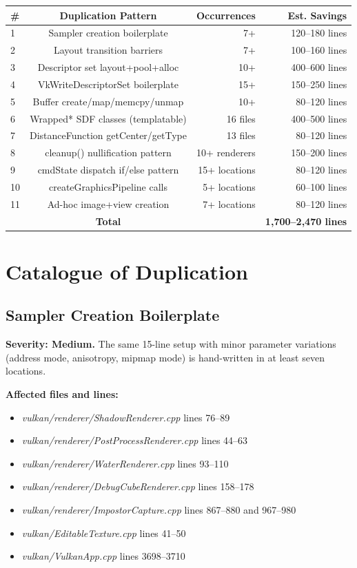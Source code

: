 \documentclass[11pt,a4paper]{article}
\newcommand{\code}[1]{\texttt{\detokenize{#1}}}
\newcommand{\file}[1]{\textsl{#1}}
\begin{document}
\begin{center}
\begin{tabular}{lcrr}
\toprule
\# & Duplication Pattern & Occurrences & Est. Savings \\
\midrule
1 & Sampler creation boilerplate & 7+ & 120--180 lines \\
2 & Layout transition barriers & 7+ & 100--160 lines \\
3 & Descriptor set layout+pool+alloc & 10+ & 400--600 lines \\
4 & VkWriteDescriptorSet boilerplate & 15+ & 150--250 lines \\
5 & Buffer create/map/memcpy/unmap & 10+ & 80--120 lines \\
6 & Wrapped* SDF classes (templatable) & 16 files & 400--500 lines \\
7 & DistanceFunction getCenter/getType & 13 files & 80--120 lines \\
8 & cleanup() nullification pattern & 10+ renderers & 150--200 lines \\
9 & cmdState dispatch if/else pattern & 15+ locations & 80--120 lines \\
10 & createGraphicsPipeline calls & 5+ locations & 60--100 lines \\
11 & Ad-hoc image+view creation & 7+ locations & 80--120 lines \\
\midrule
& \textbf{Total} & & \textbf{1,700--2,470 lines} \\
\bottomrule
\end{tabular}
\end{center}

\section{Catalogue of Duplication}

\subsection{Sampler Creation Boilerplate}
\label{sec:sampler}

\textbf{Severity: Medium.} The same 15-line \code{VkSamplerCreateInfo} setup with minor parameter variations (address mode, anisotropy, mipmap mode) is hand-written in at least seven locations.

\textbf{Affected files and lines:}
\begin{itemize}
    \item \file{vulkan/renderer/ShadowRenderer.cpp} lines 76--89
    \item \file{vulkan/renderer/PostProcessRenderer.cpp} lines 44--63
    \item \file{vulkan/renderer/WaterRenderer.cpp} lines 93--110
    \item \file{vulkan/renderer/DebugCubeRenderer.cpp} lines 158--178
    \item \file{vulkan/renderer/ImpostorCapture.cpp} lines 867--880 and 967--980
    \item \file{vulkan/EditableTexture.cpp} lines 41--50
    \item \file{vulkan/VulkanApp.cpp} lines 3698--3710
\end{itemize}
\end{document}

